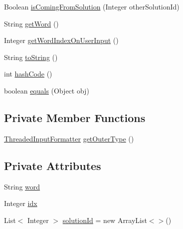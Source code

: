 \begin{DoxyCompactItemize}
\item 
Boolean \hyperlink{classit_1_1emarolab_1_1cagg_1_1core_1_1evaluation_1_1inputFormatting_1_1ThreadedInputFormatter_1_1SkippedWord_a2061a83ea85c58a042d5a6458843d0ef}{is\-Coming\-From\-Solution} (Integer other\-Solution\-Id)
\item 
String \hyperlink{classit_1_1emarolab_1_1cagg_1_1core_1_1evaluation_1_1inputFormatting_1_1ThreadedInputFormatter_1_1SkippedWord_aee802fde82f6d1af603ee91e8c80b4d5}{get\-Word} ()
\item 
Integer \hyperlink{classit_1_1emarolab_1_1cagg_1_1core_1_1evaluation_1_1inputFormatting_1_1ThreadedInputFormatter_1_1SkippedWord_ae357dda61af8e6ba6c15253d331a52fd}{get\-Word\-Index\-On\-User\-Input} ()
\item 
String \hyperlink{classit_1_1emarolab_1_1cagg_1_1core_1_1evaluation_1_1inputFormatting_1_1ThreadedInputFormatter_1_1SkippedWord_aa0c6fb69a5165d2236ea73f679a2736e}{to\-String} ()
\item 
int \hyperlink{classit_1_1emarolab_1_1cagg_1_1core_1_1evaluation_1_1inputFormatting_1_1ThreadedInputFormatter_1_1SkippedWord_af9ff4e1d03fbc05a7bd6f31c23f71bab}{hash\-Code} ()
\item 
boolean \hyperlink{classit_1_1emarolab_1_1cagg_1_1core_1_1evaluation_1_1inputFormatting_1_1ThreadedInputFormatter_1_1SkippedWord_a3c4779124128925d57d9a4c084489013}{equals} (Object obj)
\end{DoxyCompactItemize}
\subsection*{Private Member Functions}
\begin{DoxyCompactItemize}
\item 
\hyperlink{classit_1_1emarolab_1_1cagg_1_1core_1_1evaluation_1_1inputFormatting_1_1ThreadedInputFormatter}{Threaded\-Input\-Formatter} \hyperlink{classit_1_1emarolab_1_1cagg_1_1core_1_1evaluation_1_1inputFormatting_1_1ThreadedInputFormatter_1_1SkippedWord_ad31cd9752141f7ba7b5e360df2912d27}{get\-Outer\-Type} ()
\end{DoxyCompactItemize}
\subsection*{Private Attributes}
\begin{DoxyCompactItemize}
\item 
String \hyperlink{classit_1_1emarolab_1_1cagg_1_1core_1_1evaluation_1_1inputFormatting_1_1ThreadedInputFormatter_1_1SkippedWord_ab030fba8d1b4e5e692a94cc94f250355}{word}
\item 
Integer \hyperlink{classit_1_1emarolab_1_1cagg_1_1core_1_1evaluation_1_1inputFormatting_1_1ThreadedInputFormatter_1_1SkippedWord_ad4267b6003f5263502e4b955885f7482}{idx}
\item 
List$<$ Integer $>$ \hyperlink{classit_1_1emarolab_1_1cagg_1_1core_1_1evaluation_1_1inputFormatting_1_1ThreadedInputFormatter_1_1SkippedWord_a20a055dc4953f901364bd503f8101b8d}{solution\-Id} = new Array\-List$<$$>$()
\end{DoxyCompactItemize}


